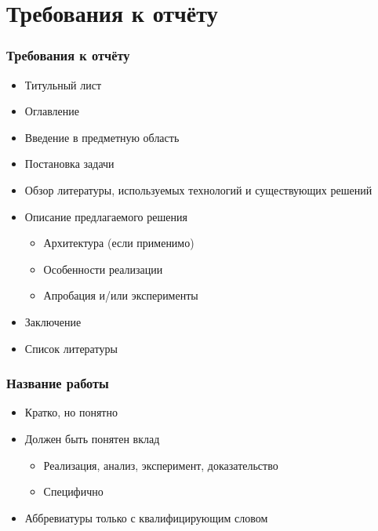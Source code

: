 \documentclass[xetex,mathserif,serif]{beamer}
\begin{document}
    \section{Требования к отчёту}

    \begin{frame}
        \frametitle{Требования к отчёту}
        \begin{itemize}
            \item Титульный лист
            \item Оглавление
            \item Введение в предметную область
            \item Постановка задачи
            \item Обзор литературы, используемых технологий и существующих решений
            \item Описание предлагаемого решения 
            \begin{itemize}
                \item Архитектура (если применимо)
                \item Особенности реализации
                \item Апробация и/или эксперименты
            \end{itemize}
            \item Заключение
            \item Список литературы
        \end{itemize}
    \end{frame}

    \begin{frame}
        \frametitle{Название работы}
        \begin{itemize}
            \item Кратко, но понятно
            \item Должен быть понятен вклад
            \begin{itemize}
                \item Реализация, анализ, эксперимент, доказательство
                \item Специфично
            \end{itemize}
            \item Аббревиатуры только с квалифицирующим словом
        \end{itemize}
    \end{frame}
\end{document}
